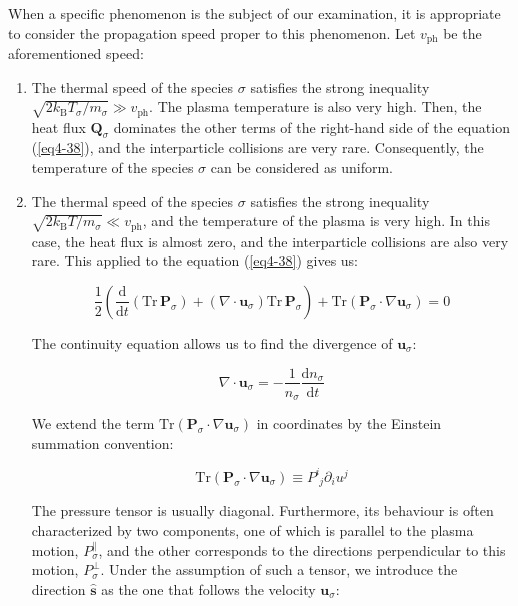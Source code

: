 When a specific phenomenon is the subject of our examination, it is appropriate to consider the propagation speed proper to this phenomenon. Let $v_\text{ph}$ be the aforementioned speed:

\begin{enumerate}
    \item The thermal speed of the species $\sigma$ satisfies the strong inequality $\sqrt{2k_\mathrm{B}T_\sigma/m_\sigma}\gg v_\text{ph}$. The plasma temperature is also very high. Then, the heat flux $\mathbf{Q}_\sigma$ dominates the other terms of the right-hand side of the equation (\ref{eq4-38}), and the interparticle collisions are very rare. Consequently, the temperature of the species $\sigma$ can be considered as uniform.
    \item The thermal speed of the species $\sigma$ satisfies the strong inequality $\sqrt{2k_\mathrm{B}T/m_\sigma}\ll v_\text{ph}$, and the temperature of the plasma is very high. In this case, the heat flux is almost zero, and the interparticle collisions are also very rare. This applied to the equation (\ref{eq4-38}) gives us:

    \begin{equation}
        \label{eq4-42}
        \frac{1}{2}\left(\frac{\mathrm{d}}{\mathrm{d}t}\left(\mathrm{Tr}\,\mathbf{P}_\sigma\right)+(\nabla\cdot\mathbf{u}_\sigma)\mathrm{Tr}\,\mathbf{P}_\sigma\right)+{\mathrm{Tr}\left(\mathbf{P}_\sigma\cdot\nabla\mathbf{u}_\sigma\right)}=0
    \end{equation}

    The continuity equation allows us to find the divergence of $\mathbf{u}_\sigma$:

    \begin{equation}
        \nabla\cdot\mathbf{u}_\sigma=-\frac{1}{n_\sigma}\frac{\mathrm{d}n_\sigma}{\mathrm{d}t}
    \end{equation}

    We extend the term $\mathrm{Tr}\left(\mathbf{P}_\sigma\cdot\nabla\mathbf{u}_\sigma\right)$ in coordinates by the Einstein summation convention:

    \begin{equation}
        \mathrm{Tr}\left(\mathbf{P}_\sigma\cdot\nabla\mathbf{u}_\sigma\right)\equiv P^{i}_{\,\,j}\partial_iu^j
    \end{equation}

    The pressure tensor is usually diagonal. Furthermore, its behaviour is often characterized by two components, one of which is parallel to the plasma motion, $P_\sigma^\parallel$, and the other corresponds to the directions perpendicular to this motion, $P_\sigma^\perp$. Under the assumption of such a tensor, we introduce the direction $\mathbf{\hat{s}}$ as the one that follows the velocity $\mathbf{u}_\sigma$:


\end{enumerate}
